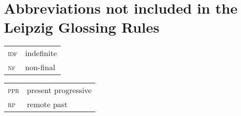 \documentclass[output=paper]{langsci/langscibook}
\begin{document}
\section*{Abbreviations not included in the Leipzig Glossing Rules}
\begin{tabular}{ll}
\textsc{idf} &  indefinite       \\
\textsc{nf} &  non-final\\
\end{tabular}
\begin{tabular}{ll}
\textsc{ppr} & present progressive\\   
\textsc{rp}  & remote past\\           
\end{tabular}


{\sloppy
\printbibliography[heading=subbibliography,notkeyword=this]
}
\end{document}
